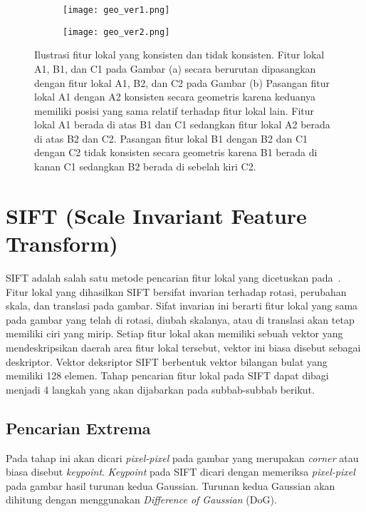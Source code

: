 \begin{figure}[H]
	\begin{subfigure}[b]{.5\textwidth}
		\centering
		\texttt{[image: geo\_ver1.png]}
		\caption{}
		\label{subfig:geo_ver1}
	\end{subfigure}%
	\begin{subfigure}[b]{.5\textwidth}
		\centering
		\texttt{[image: geo\_ver2.png]}
		\caption{}
		\label{subfig:geo_ver2}
	\end{subfigure}
	\caption{Ilustrasi fitur lokal yang konsisten dan tidak konsisten. Fitur lokal A1, B1, dan C1 pada Gambar (a) secara berurutan dipasangkan dengan fitur lokal A1, B2, dan C2 pada Gambar (b) Pasangan fitur lokal A1 dengan A2 konsisten secara geometris karena keduanya memiliki posisi yang sama relatif terhadap fitur lokal lain. Fitur lokal A1 berada di atas B1 dan C1 sedangkan fitur lokal A2 berada di atas B2 dan C2. Pasangan fitur lokal B1 dengan B2 dan C1 dengan C2 tidak konsisten secara geometris karena B1 berada di kanan C1 sedangkan B2 berada di sebelah kiri C2.}
	\label{fig:geo_ver}
\end{figure}

\section{SIFT (Scale Invariant Feature Transform)}
\label{sec:sift}

SIFT adalah salah satu metode pencarian fitur lokal yang dicetuskan pada~\cite{lowe2004sift}. Fitur lokal yang dihasilkan SIFT bersifat invarian terhadap rotasi, perubahan skala, dan translasi pada gambar. Sifat invarian ini berarti fitur lokal yang sama pada gambar yang telah di rotasi, diubah skalanya, atau di translasi akan tetap memiliki ciri yang mirip. Setiap fitur lokal akan memiliki sebuah vektor yang mendeskripsikan daerah area fitur lokal tersebut, vektor ini biasa disebut sebagai deskriptor. Vektor deksriptor SIFT berbentuk vektor bilangan bulat yang memiliki 128 elemen. Tahap pencarian fitur lokal pada SIFT dapat dibagi menjadi 4 langkah yang akan dijabarkan pada subbab-subbab berikut.

\subsection{Pencarian Extrema}
Pada tahap ini akan dicari \textit{pixel-pixel} pada gambar yang merupakan \textit{corner} atau biasa disebut \textit{keypoint}. \textit{Keypoint} pada SIFT dicari dengan memeriksa \textit{pixel-pixel} pada gambar hasil turunan kedua Gaussian. Turunan kedua Gaussian akan dihitung dengan menggunakan \textit{Difference of Gaussian} (DoG).

